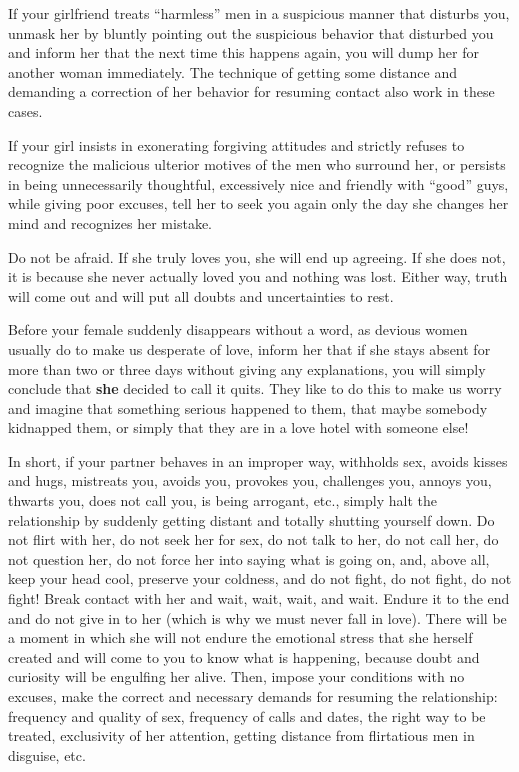 \par If your girlfriend treats \enquote{harmless} men in a suspicious manner that disturbs you, unmask her by bluntly pointing out the suspicious behavior that disturbed you and inform her that the next time this happens again, you will dump her for another woman immediately. The technique of getting some distance and demanding a correction of her behavior for resuming contact also work in these cases.

\par If your girl insists in exonerating forgiving attitudes and strictly refuses to recognize the malicious ulterior motives of the men who surround her, or persists in being unnecessarily thoughtful, excessively nice and friendly with \enquote{good} guys\footnotemark[20], while giving poor excuses, tell her to seek you again only the day she changes her mind and recognizes her mistake.


\par Do not be afraid. If she truly loves you, she will end up agreeing. If she does not, it is because she never actually loved you and nothing was lost. Either way, truth will come out and will put all doubts and uncertainties to rest.

\par Before your female suddenly disappears without a word, as devious women usually do to make us desperate of love, inform her that if she stays absent for more than two or three days without giving any explanations, you will simply conclude that \textbf{she} decided to call it quits. They like to do this to make us worry and imagine that something serious happened to them, that maybe somebody kidnapped them, or simply that they are in a love hotel with someone else!

\par In short, if your partner behaves in an improper way, withholds sex, avoids kisses and hugs, mistreats you, avoids you, provokes you, challenges you, annoys you, thwarts you, does not call you, is being arrogant, etc., simply halt the relationship by suddenly getting distant and totally shutting yourself down. Do not flirt with her, do not seek her for sex, do not talk to her, do not call her, do not question her, do not force her into saying what is going on, and, above all, keep your head cool, preserve your coldness, and do not fight, do not fight, do not fight! Break contact with her and wait, wait, wait, and wait. Endure it to the end and do not give in to her (which is why we must never fall in love). There will be a moment in which she will not endure the emotional stress that she herself created and will come to you to know what is happening, because doubt and curiosity will be engulfing her alive. Then, impose your conditions with no excuses, make the correct and necessary demands for resuming the relationship: frequency and quality of sex\footnotemark[21], frequency of calls and dates, the right way to be treated, exclusivity of her attention, getting distance from flirtatious men in disguise, etc.

